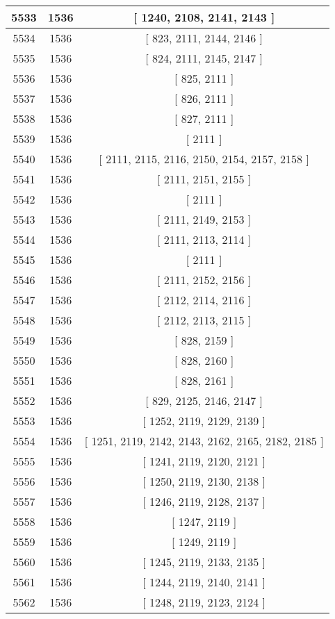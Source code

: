 \begin{center}
\begin{longtable}[H]{|| c c c ||}
\hline
5533 & 1536 & [ 1240, 2108, 2141, 2143 ] \\ 
\hline
5534 & 1536 & [ 823, 2111, 2144, 2146 ] \\ 
\hline
5535 & 1536 & [ 824, 2111, 2145, 2147 ] \\ 
\hline
5536 & 1536 & [ 825, 2111 ] \\ 
\hline
5537 & 1536 & [ 826, 2111 ] \\ 
\hline
5538 & 1536 & [ 827, 2111 ] \\ 
\hline
5539 & 1536 & [ 2111 ] \\ 
\hline
5540 & 1536 & [ 2111, 2115, 2116, 2150, 2154, 2157, 2158 ] \\ 
\hline
5541 & 1536 & [ 2111, 2151, 2155 ] \\ 
\hline
5542 & 1536 & [ 2111 ] \\ 
\hline
5543 & 1536 & [ 2111, 2149, 2153 ] \\ 
\hline
5544 & 1536 & [ 2111, 2113, 2114 ] \\ 
\hline
5545 & 1536 & [ 2111 ] \\ 
\hline
5546 & 1536 & [ 2111, 2152, 2156 ] \\ 
\hline
5547 & 1536 & [ 2112, 2114, 2116 ] \\ 
\hline
5548 & 1536 & [ 2112, 2113, 2115 ] \\ 
\hline
5549 & 1536 & [ 828, 2159 ] \\ 
\hline
5550 & 1536 & [ 828, 2160 ] \\ 
\hline
5551 & 1536 & [ 828, 2161 ] \\ 
\hline
5552 & 1536 & [ 829, 2125, 2146, 2147 ] \\ 
\hline
5553 & 1536 & [ 1252, 2119, 2129, 2139 ] \\ 
\hline
5554 & 1536 & [ 1251, 2119, 2142, 2143, 2162, 2165, 2182, 2185 ] \\ 
\hline
5555 & 1536 & [ 1241, 2119, 2120, 2121 ] \\ 
\hline
5556 & 1536 & [ 1250, 2119, 2130, 2138 ] \\ 
\hline
5557 & 1536 & [ 1246, 2119, 2128, 2137 ] \\ 
\hline
5558 & 1536 & [ 1247, 2119 ] \\ 
\hline
5559 & 1536 & [ 1249, 2119 ] \\ 
\hline
5560 & 1536 & [ 1245, 2119, 2133, 2135 ] \\ 
\hline
5561 & 1536 & [ 1244, 2119, 2140, 2141 ] \\ 
\hline
5562 & 1536 & [ 1248, 2119, 2123, 2124 ] \\ 

\end{longtable}
\end{center}

